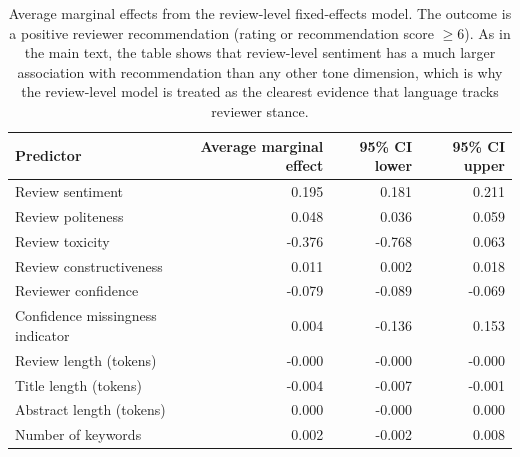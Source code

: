\begin{table}[!htbp]
\centering
\begingroup
\normalsize
\renewcommand{\arraystretch}{1.20}
\setlength{\tabcolsep}{6pt}
\caption{Average marginal effects from the review-level fixed-effects model. The outcome is a positive reviewer recommendation (rating or recommendation score $\ge 6$). As in the main text, the table shows that review-level sentiment has a much larger association with recommendation than any other tone dimension, which is why the review-level model is treated as the clearest evidence that language tracks reviewer stance.}
\label{tab:app:reviewame}
\begin{tabular}{lrrr}
\toprule
Predictor & Average marginal effect & 95\% CI lower & 95\% CI upper \\
\midrule
Review sentiment & 0.195 & 0.181 & 0.211 \\
Review politeness & 0.048 & 0.036 & 0.059 \\
Review toxicity & -0.376 & -0.768 & 0.063 \\
Review constructiveness & 0.011 & 0.002 & 0.018 \\
Reviewer confidence & -0.079 & -0.089 & -0.069 \\
Confidence missingness indicator & 0.004 & -0.136 & 0.153 \\
Review length (tokens) & -0.000 & -0.000 & -0.000 \\
Title length (tokens) & -0.004 & -0.007 & -0.001 \\
Abstract length (tokens) & 0.000 & -0.000 & 0.000 \\
Number of keywords & 0.002 & -0.002 & 0.008 \\
\bottomrule
\end{tabular}
\endgroup
\end{table}

